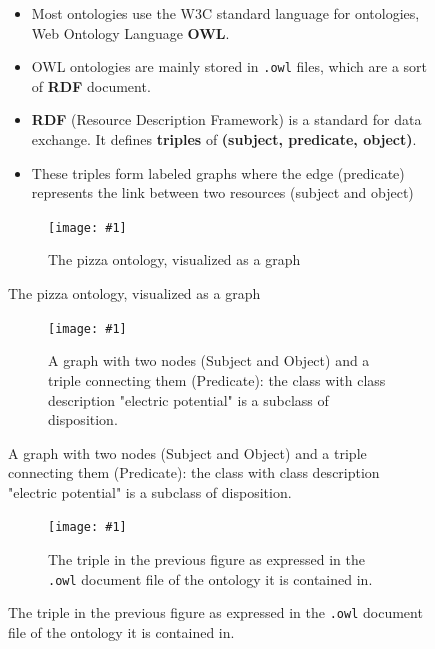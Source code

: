 \documentclass[english, xcolor=dvipsnames, aspectratio=169]{beamer}
\newcommand{\includefigurelarger}[2]
{
    \begin{figure}[h]
    \caption{#2}
    \centering
    \texttt{[image: \#1]}
    \end{figure}
}
\newcommand{\subsectiontitle}{}
\begin{document}
\begin{frame}{\subsectiontitle}
    \begin{figure}
        \begin{minipage}[b]{0.55\linewidth}
 			\begin{itemize}
\item Most ontologies use the W3C standard language for ontologies, Web Ontology Language \textbf{OWL}.
\item OWL ontologies are mainly stored in \texttt{.owl} files, which are a sort of \textbf{RDF} document.
\item \textbf{RDF} (Resource Description Framework) is a standard for data exchange. It defines \textbf{triples} of \textbf{(subject, predicate, object)}. \cite{noauthor_rdf_nodate}
\item These triples form labeled graphs where the edge (predicate) represents the link between two resources (subject and object)
    		\end{itemize}
        \end{minipage}
    \hfill
     \begin{minipage}[b]{0.4\linewidth}
            \centering
            \includefigurelarger{pizzaontology.png}{The pizza ontology, visualized as a graph \cite{drummond_pizza_nodate}}
        \end{minipage}
    \end{figure}
\end{frame}


% 
\begin{frame}{\subsectiontitle}

     
\begin{figure}
    
    \centering
	\includefigurelarger{rdf-graph-triple.pdf}{A graph with two nodes (Subject and Object) and a triple connecting them (Predicate): the class with class description "electric potential" is a subclass of disposition.}
    \end{figure}
\end{frame}

% 
\begin{frame}{\subsectiontitle}

     
\begin{figure}
    \centering
	\includefigurelarger{rdf-owl.pdf}{The triple in the previous figure as expressed in the \texttt{.owl} document file of the ontology it is contained in.}
    \end{figure}
\end{frame}
\end{document}
